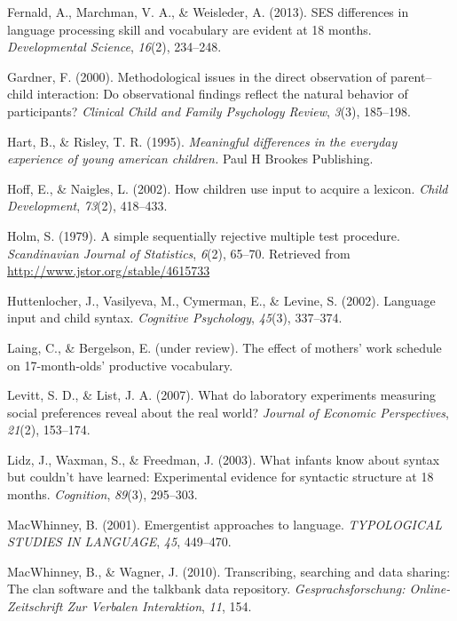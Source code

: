 \documentclass[man]{apa6}
\theoremstyle{definition}
\theoremstyle{definition}
\theoremstyle{definition}
\theoremstyle{remark}
\begin{document}
\hypertarget{ref-fernald2013ses}{}
Fernald, A., Marchman, V. A., \& Weisleder, A. (2013). SES differences
in language processing skill and vocabulary are evident at 18 months.
\emph{Developmental Science}, \emph{16}(2), 234--248.

\hypertarget{ref-gardner2000methodological}{}
Gardner, F. (2000). Methodological issues in the direct observation of
parent--child interaction: Do observational findings reflect the natural
behavior of participants? \emph{Clinical Child and Family Psychology
Review}, \emph{3}(3), 185--198.

\hypertarget{ref-hart1995meaningful}{}
Hart, B., \& Risley, T. R. (1995). \emph{Meaningful differences in the
everyday experience of young american children.} Paul H Brookes
Publishing.

\hypertarget{ref-hoff2002children}{}
Hoff, E., \& Naigles, L. (2002). How children use input to acquire a
lexicon. \emph{Child Development}, \emph{73}(2), 418--433.

\hypertarget{ref-holm1979simple}{}
Holm, S. (1979). A simple sequentially rejective multiple test
procedure. \emph{Scandinavian Journal of Statistics}, \emph{6}(2),
65--70. Retrieved from \url{http://www.jstor.org/stable/4615733}

\hypertarget{ref-huttenlocher2002language}{}
Huttenlocher, J., Vasilyeva, M., Cymerman, E., \& Levine, S. (2002).
Language input and child syntax. \emph{Cognitive Psychology},
\emph{45}(3), 337--374.

\hypertarget{ref-Laing_Bergelson_17}{}
Laing, C., \& Bergelson, E. (under review). The effect of mothers' work
schedule on 17-month-olds' productive vocabulary.

\hypertarget{ref-levitt2007laboratory}{}
Levitt, S. D., \& List, J. A. (2007). What do laboratory experiments
measuring social preferences reveal about the real world? \emph{Journal
of Economic Perspectives}, \emph{21}(2), 153--174.

\hypertarget{ref-lidz2003infants}{}
Lidz, J., Waxman, S., \& Freedman, J. (2003). What infants know about
syntax but couldn't have learned: Experimental evidence for syntactic
structure at 18 months. \emph{Cognition}, \emph{89}(3), 295--303.

\hypertarget{ref-macwhinney2001emergentist}{}
MacWhinney, B. (2001). Emergentist approaches to language.
\emph{TYPOLOGICAL STUDIES IN LANGUAGE}, \emph{45}, 449--470.

\hypertarget{ref-macwhinney2010transcribing}{}
MacWhinney, B., \& Wagner, J. (2010). Transcribing, searching and data
sharing: The clan software and the talkbank data repository.
\emph{Gesprachsforschung: Online-Zeitschrift Zur Verbalen Interaktion},
\emph{11}, 154.
\end{document}
